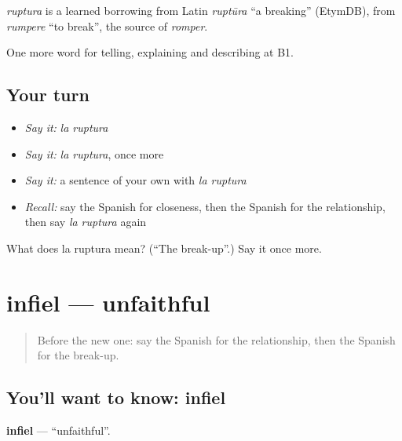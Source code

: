 \begin{cousinweb}
\emph{ruptura} is a learned borrowing from Latin \emph{ruptūra} \textquotedblleft{}a breaking\textquotedblright{} (EtymDB), from \emph{rumpere} \textquotedblleft{}to break\textquotedblright{}, the source of \emph{romper}.
\end{cousinweb}

\begin{grammarlens}[title={What you've built}]
One more word for telling, explaining and describing at B1.
\end{grammarlens}

\subsection*{Your turn}
\begin{itemize}
\raggedright
  \item \emph{Say it:} \emph{la ruptura}
  \item \emph{Say it:} \emph{la ruptura}, once more
  \item \emph{Say it:} a sentence of your own with \emph{la ruptura}
  \item \emph{Recall:} say the Spanish for closeness, then the Spanish for the relationship, then say \emph{la ruptura} again
\end{itemize}

\begin{tcolorbox}[breakable,colback=teal!4,colframe=teal!35!black,title={Before you move on}]
What does la ruptura mean? (\textquotedblleft{}The break-up\textquotedblright{}.) Say it once more.
\end{tcolorbox}
\section[infiel]{infiel — unfaithful}

\label{lesson:ES-C745-infiel}



\begin{quote}
Before the new one: say the Spanish for the relationship, then the Spanish for the break-up.
\end{quote}

\subsection*{You'll want to know: infiel}
\textbf{infiel} — \textquotedblleft{}unfaithful\textquotedblright{}.

